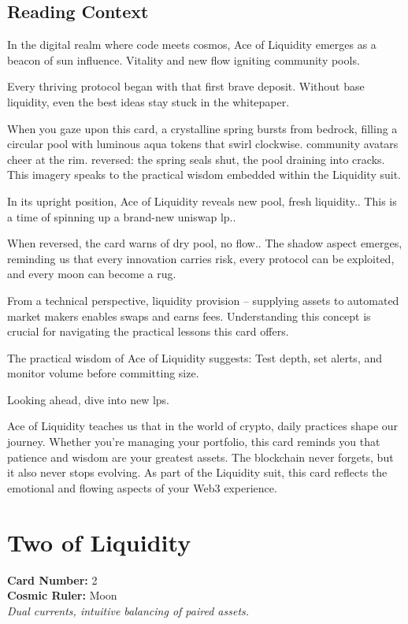 \documentclass[11pt,oneside]{book}
\begin{document}
\begin{minipage}[t]{0.55\textwidth}
  \subsection*{Reading Context}
  In the digital realm where code meets cosmos, Ace of Liquidity emerges as a beacon of sun influence. Vitality and new flow igniting community pools.

  Every thriving protocol began with that first brave deposit. Without base liquidity, even the best ideas stay stuck in the whitepaper.

  When you gaze upon this card, a crystalline spring bursts from bedrock, filling a circular pool with luminous aqua tokens that swirl clockwise. community avatars cheer at the rim. reversed: the spring seals shut, the pool draining into cracks. This imagery speaks to the practical wisdom embedded within the Liquidity suit.

  In its upright position, Ace of Liquidity reveals new pool, fresh liquidity.. This is a time of spinning up a brand-new uniswap lp..

  When reversed, the card warns of dry pool, no flow.. The shadow aspect emerges, reminding us that every innovation carries risk, every protocol can be exploited, and every moon can become a rug.

  From a technical perspective, liquidity provision – supplying assets to automated market makers enables swaps and earns fees. Understanding this concept is crucial for navigating the practical lessons this card offers.

  The practical wisdom of Ace of Liquidity suggests: Test depth, set alerts, and monitor volume before committing size.

  Looking ahead, dive into new lps.

  Ace of Liquidity teaches us that in the world of crypto, daily practices shape our journey. Whether you're managing your portfolio, this card reminds you that patience and wisdom are your greatest assets. The blockchain never forgets, but it also never stops evolving. As part of the Liquidity suit, this card reflects the emotional and flowing aspects of your Web3 experience.

\end{minipage}

\newpage
\section*{Two of Liquidity}

\begin{minipage}[t]{0.55\textwidth}
  \vspace{0pt}
  \textbf{Card Number:} 2\\  \textbf{Cosmic Ruler:} Moon\\  \textit{Dual currents, intuitive balancing of paired assets.}
\end{minipage}
\end{document}
